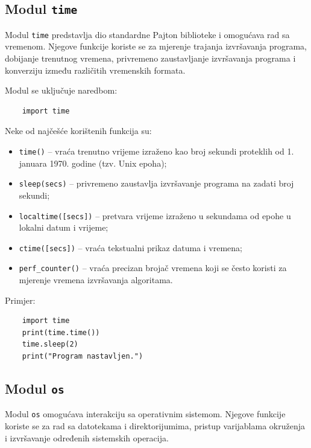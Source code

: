 \subsection{Modul \texttt{time}}

Modul \texttt{time} predstavlja dio standardne Pajton biblioteke i omogućava rad sa vremenom. Njegove funkcije koriste se za mjerenje trajanja izvršavanja programa, dobijanje trenutnog vremena, privremeno zaustavljanje izvršavanja programa i konverziju između različitih vremenskih formata.

Modul se uključuje naredbom:
\begin{verbatim}
	import time
\end{verbatim}

Neke od najčešće korištenih funkcija su:

\begin{itemize}
	\item \texttt{time()} -- vraća trenutno vrijeme izraženo kao broj sekundi proteklih od 1. januara 1970. godine (tzv. Unix epoha);
	
	\item \texttt{sleep(secs)} -- privremeno zaustavlja izvršavanje programa na zadati broj sekundi;
	
	\item \texttt{localtime([secs])} -- pretvara vrijeme izraženo u sekundama od epohe u lokalni datum i vrijeme;
	
	\item \texttt{ctime([secs])} -- vraća tekstualni prikaz datuma i vremena;
	
	\item \texttt{perf\_counter()} -- vraća precizan brojač vremena koji se često koristi za mjerenje vremena izvršavanja algoritama.
	
\end{itemize}

Primjer:

\begin{verbatim}
	import time
	print(time.time())
	time.sleep(2)
	print("Program nastavljen.")
\end{verbatim}

\subsection{Modul \texttt{os}}

Modul \texttt{os} omogućava interakciju sa operativnim sistemom. Njegove funkcije koriste se za rad sa datotekama i direktorijumima, pristup varijablama okruženja i izvršavanje određenih sistemskih operacija.

